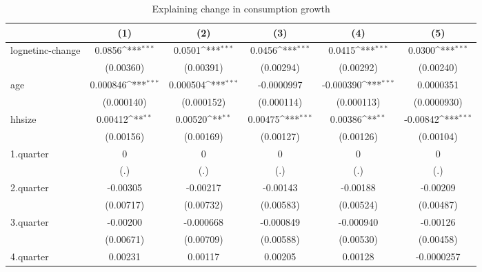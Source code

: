 \begin{table}[htbp]\centering
\def\sym#1{\ifmmode^{#1}\else\(^{#1}\)\fi}
\caption{\label{tab:log2.2B-deltacons-net} Explaining change in consumption growth}
\begin{tabular}{l*{5}{c}}
\hline\hline
            &\multicolumn{1}{c}{(1)}         &\multicolumn{1}{c}{(2)}         &\multicolumn{1}{c}{(3)}         &\multicolumn{1}{c}{(4)}         &\multicolumn{1}{c}{(5)}         \\
\hline
lognetinc-change&      0.0856\sym{***}&      0.0501\sym{***}&      0.0456\sym{***}&      0.0415\sym{***}&      0.0300\sym{***}\\
            &   (0.00360)         &   (0.00391)         &   (0.00294)         &   (0.00292)         &   (0.00240)         \\
age         &    0.000846\sym{***}&    0.000504\sym{***}&  -0.0000997         &   -0.000390\sym{***}&   0.0000351         \\
            &  (0.000140)         &  (0.000152)         &  (0.000114)         &  (0.000113)         & (0.0000930)         \\
hhsize      &     0.00412\sym{**} &     0.00520\sym{**} &     0.00475\sym{***}&     0.00386\sym{**} &    -0.00842\sym{***}\\
            &   (0.00156)         &   (0.00169)         &   (0.00127)         &   (0.00126)         &   (0.00104)         \\
1.quarter   &           0         &           0         &           0         &           0         &           0         \\
            &         (.)         &         (.)         &         (.)         &         (.)         &         (.)         \\
2.quarter   &    -0.00305         &    -0.00217         &    -0.00143         &    -0.00188         &    -0.00209         \\
            &   (0.00717)         &   (0.00732)         &   (0.00583)         &   (0.00524)         &   (0.00487)         \\
3.quarter   &    -0.00200         &   -0.000668         &   -0.000849         &   -0.000940         &    -0.00126         \\
            &   (0.00671)         &   (0.00709)         &   (0.00588)         &   (0.00530)         &   (0.00458)         \\
4.quarter   &     0.00231         &     0.00117         &     0.00205         &     0.00128         &  -0.0000257         \\

\end{tabular}
\end{table}
